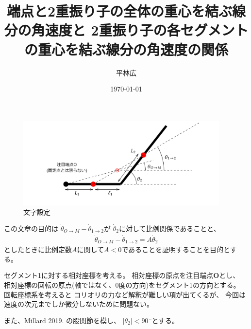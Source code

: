 \documentclass[a4paper,11pt]{jsarticle}
\begin{document}
\title{
  端点と2重振り子の全体の重心を結ぶ線分の角速度と
  2重振り子の各セグメントの重心を結ぶ線分の角速度の関係
}
\author{平林広}
\date{\today}
\maketitle

\begin{figure}[h]
  \centering
  \includegraphics[width = 0.95\textwidth]{conf.png}
  \caption{文字設定}
  \label{conf.png}
\end{figure}

この文章の目的は
$\dot\theta_{O\rightarrow M} - \dot\theta_{1\rightarrow 2}$が
$\dot\theta_2$に対して比例関係であることと、
\begin{gather}
  \dot\theta_{O\rightarrow M} - \dot\theta_{1\rightarrow 2}
  = A \dot\theta_2
\end{gather}
としたときに比例定数$A$に関して$A<0$であることを証明することを目的とする。

セグメント1に対する相対座標を考える。
相対座標の原点を注目端点$\mathbf{O}$とし、
相対座標の回転の原点(軸ではなく、0度の方向)をセグメント1の方向とする。
回転座標系を考えると
コリオリの力など解釈が難しい項が出てくるが、
今回は速度の次元までしか微分しないために問題ない。

また、Millard 2019. の股関節を模し、
$|\theta_2|<90\,^\circ$とする。
\end{document}
